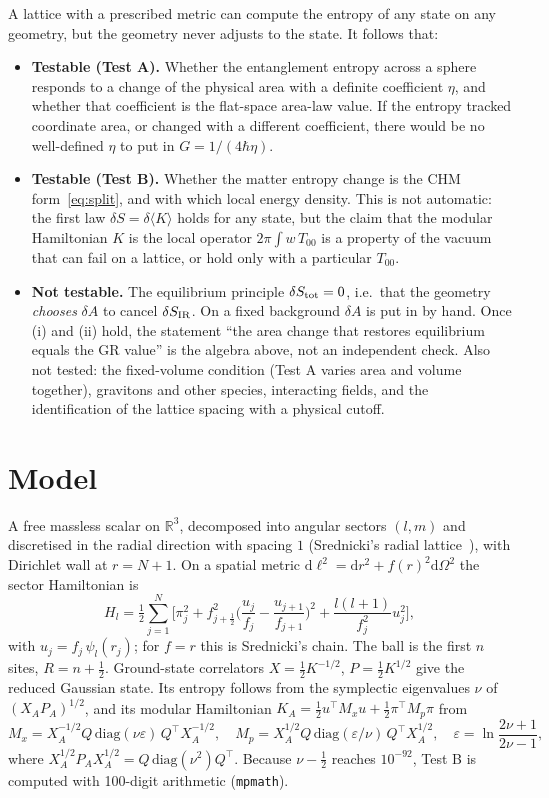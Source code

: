 \documentclass[11pt]{article}
\newcommand{\dd}{\mathrm{d}}
\begin{document}
A lattice with a prescribed metric can compute the entropy of any state on any geometry, but the geometry never adjusts to the state. It follows that:
\begin{itemize}
\item \textbf{Testable (Test A).} Whether the entanglement entropy across a sphere responds to a change of the physical area with a definite coefficient $\eta$, and whether that coefficient is the flat-space area-law value. If the entropy tracked coordinate area, or changed with a different coefficient, there would be no well-defined $\eta$ to put in $G=1/(4\hbar\eta)$.
\item \textbf{Testable (Test B).} Whether the matter entropy change is the CHM form~\eqref{eq:split}, and with which local energy density. This is not automatic: the first law $\delta S=\delta\langle K\rangle$ holds for any state, but the claim that the modular Hamiltonian $K$ is the local operator $2\pi\int w\,T_{00}$ is a property of the vacuum that can fail on a lattice, or hold only with a particular $T_{00}$.
\item \textbf{Not testable.} The equilibrium principle $\delta S_{\rm tot}=0$, i.e.\ that the geometry \emph{chooses} $\delta A$ to cancel $\delta S_{\rm IR}$. On a fixed background $\delta A$ is put in by hand. Once (i) and (ii) hold, the statement ``the area change that restores equilibrium equals the GR value'' is the algebra above, not an independent check. Also not tested: the fixed-volume condition (Test A varies area and volume together), gravitons and other species, interacting fields, and the identification of the lattice spacing with a physical cutoff.
\end{itemize}

\section{Model}
A free massless scalar on $\mathbb{R}^3$, decomposed into angular sectors $(l,m)$ and discretised in the radial direction with spacing $1$ (Srednicki's radial lattice~\cite{Srednicki1993}), with Dirichlet wall at $r=N+1$. On a spatial metric $\dd\ell^2=\dd r^2+f(r)^2\dd\Omega^2$ the sector Hamiltonian is
\begin{equation}
H_l=\tfrac12\sum_{j=1}^{N}\Big[\pi_j^2+f_{j+\frac12}^2\Big(\frac{u_j}{f_j}-\frac{u_{j+1}}{f_{j+1}}\Big)^{\!2}+\frac{l(l+1)}{f_j^2}u_j^2\Big],
\end{equation}
with $u_j=f_j\,\psi_l(r_j)$; for $f=r$ this is Srednicki's chain. The ball is the first $n$ sites, $R=n+\tfrac12$. Ground-state correlators $X=\tfrac12K^{-1/2}$, $P=\tfrac12K^{1/2}$ give the reduced Gaussian state. Its entropy follows from the symplectic eigenvalues $\nu$ of $(X_AP_A)^{1/2}$, and its modular Hamiltonian $K_A=\tfrac12u^\top M_xu+\tfrac12\pi^\top M_p\pi$ from
\begin{equation}
M_x=X_A^{-1/2}Q\,\mathrm{diag}(\nu\varepsilon)\,Q^\top X_A^{-1/2},\quad
M_p=X_A^{1/2}Q\,\mathrm{diag}(\varepsilon/\nu)\,Q^\top X_A^{1/2},\quad \varepsilon=\ln\frac{2\nu+1}{2\nu-1},
\end{equation}
where $X_A^{1/2}P_AX_A^{1/2}=Q\,\mathrm{diag}(\nu^2)Q^\top$. Because $\nu-\tfrac12$ reaches $10^{-92}$, Test B is computed with 100-digit arithmetic (\texttt{mpmath}).
\end{document}
